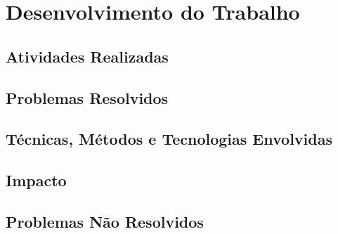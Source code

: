 \chapter{Desenvolvimento do Trabalho}
\label{ch:desenvolvimento-do-trabalho}

\section{Atividades Realizadas}



\section{Problemas Resolvidos}



\section{Técnicas, Métodos e Tecnologias Envolvidas}



\section{Impacto}



\section{Problemas Não Resolvidos}


